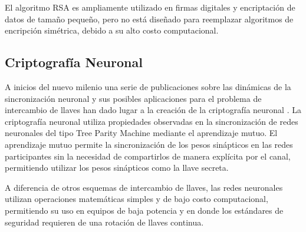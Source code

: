 El algoritmo RSA es ampliamente utilizado en firmas digitales y encriptación de datos de tamaño pequeño, pero no está diseñado para reemplazar algoritmos de encripción simétrica, debido a su alto costo computacional.


\subsection{Criptografía Neuronal}
A inicios del nuevo milenio una serie de publicaciones sobre las
dinámicas de la sincronización neuronal y sus posibles aplicaciones para el
problema de intercambio de llaves han dado lugar a la creación de la
criptografía neuronal \cite{ruttor_neural_2006}. La criptografía neuronal utiliza
propiedades observadas en la sincronización de redes neuronales del tipo Tree
Parity Machine mediante el aprendizaje mutuo. El aprendizaje mutuo permite
la sincronización de los pesos sinápticos en las redes participantes sin la
necesidad de compartirlos de manera explícita por el canal, permitiendo utilizar
los pesos sinápticos como la llave secreta. 

A diferencia de otros esquemas de intercambio de llaves, las redes neuronales utilizan operaciones matemáticas simples y de bajo costo computacional, permitiendo su uso en equipos de baja potencia y en donde los estándares de seguridad requieren de una rotación de llaves continua.